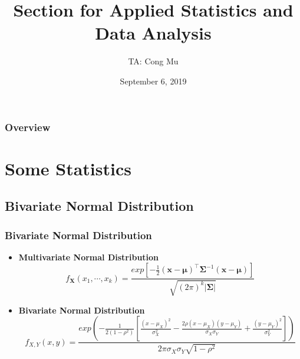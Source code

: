 \documentclass[serif,mathserif,professionalfont]{beamer}
\title[Section for EN.553.413/613]{Section for Applied Statistics and Data Analysis} %
\author{TA: Cong Mu} %
\institute[cmu2@jhu.edu] %
{
Office Hour: Wednesday 10:00AM - 12:00PM
\medskip
\textit{} %
}
\date{September 6, 2019} %
\begin{document}
\begin{frame}
\titlepage %
\end{frame}

\begin{frame}
\frametitle{Overview} %
\tableofcontents %
\end{frame}




\section{Some Statistics}

\subsection{Bivariate Normal Distribution}


\begin{frame}
	
	\frametitle{Bivariate Normal Distribution}
	
	\begin{itemize}
		\item \textbf{Multivariate Normal Distribution} 
		$$ f_{\bm{X}}(x_1, \cdots, x_k) = \frac{exp \left[ - \frac{1}{2} (\bm{x} - \bm{\mu})^\top \bm{\Sigma}^{-1} (\bm{x} - \bm{\mu}) \right]}{\sqrt{(2\pi)^k |\bm{\Sigma}|}} $$
		\item \textbf{Bivariate Normal Distribution} 
		$$ f_{X,Y}(x, y) = \frac{exp \left(- \frac{1}{2 (1-\rho^2)} \left[\frac{(x-\mu_X)^2}{\sigma_X^2} - \frac{2 \rho (x-\mu_X)(y-\mu_Y)}{\sigma_X \sigma_Y} + \frac{(y-\mu_Y)^2}{\sigma_Y^2} \right] \right)}{2 \pi \sigma_X \sigma_Y \sqrt{1 - \rho^2} } $$
	\end{itemize}

\end{frame}
\end{document}
